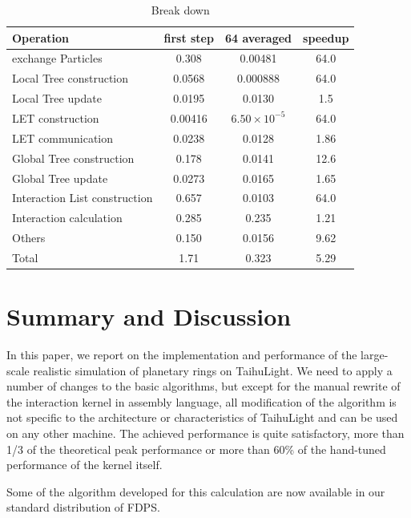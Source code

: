 \documentclass[oribibl]{llncs}
\begin{document}
\begin{table}
  \caption{Break down}
  \label{tab:break_down}
  \begin{tabular}{lccc}
    \toprule
    Operation & first step & 64 averaged & speedup\\
    \midrule
    exchange Particles            & 0.308   & 0.00481  & 64.0 \\
    Local Tree construction       & 0.0568  & 0.000888 & 64.0 \\
    Local Tree update             & 0.0195  & 0.0130   & 1.5 \\
    LET construction              & 0.00416 &  $6.50 \times 10^{-5}$  & 64.0 \\
    LET communication             & 0.0238  & 0.0128   & 1.86 \\
    Global Tree construction      & 0.178   & 0.0141   & 12.6 \\
    Global Tree update                 & 0.0273  & 0.0165   & 1.65 \\
    Interaction List construction & 0.657   & 0.0103   & 64.0 \\
    Interaction calculation       & 0.285   & 0.235    & 1.21 \\
    Others                        & 0.150   & 0.0156   & 9.62 \\
    \midrule
    Total                         & 1.71   & 0.323     & 5.29 \\
  \bottomrule
  \end{tabular}
\end{table}

\section{Summary and Discussion}
\label{sec:discussion}

In this paper, we report on the implementation and performance of the
large-scale realistic simulation of planetary rings on TaihuLight.  We
need to apply a number of changes to the basic algorithms, but except
for the manual rewrite of the interaction kernel in assembly language,
all modification of the algorithm is not specific to the architecture
or characteristics of TaihuLight and can be used on any other
machine. The achieved performance is quite satisfactory, more than
1/3 of the theoretical peak performance or more than 60\% of the
hand-tuned performance of the kernel itself.

Some of the algorithm developed for this calculation are now available
in our standard distribution of FDPS.
\end{document}
